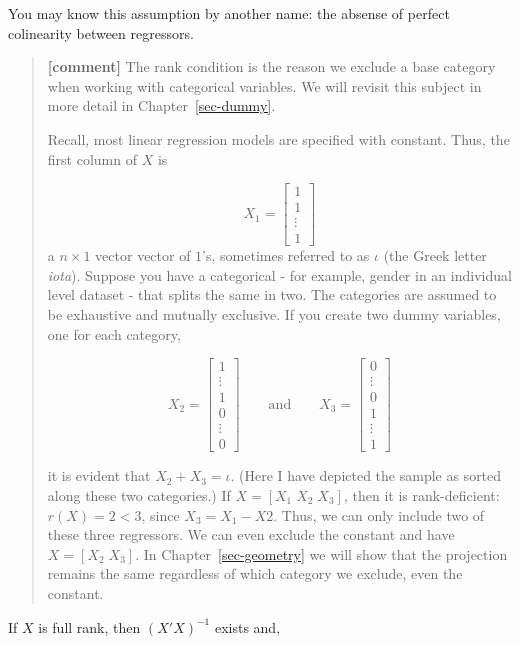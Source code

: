 \documentclass[
  letterpaper,
  DIV=11,
  numbers=noendperiod]{scrreprt}
\begin{document}
You may know this assumption by another name: the absense of perfect
colinearity between regressors.

\begin{quote}
\textbf{{[}comment{]}} The rank condition is the reason we exclude a
base category when working with categorical variables. We will revisit
this subject in more detail in Chapter~\ref{sec-dummy}.

Recall, most linear regression models are specified with constant. Thus,
the first column of \(X\) is

\[ X_1 = \begin{bmatrix}1 \\ 1 \\ \vdots \\ 1\end{bmatrix} \] a
\(n\times 1\) vector vector of \(1\)'s, sometimes referred to as
\(\iota\) (the Greek letter \emph{iota}). Suppose you have a categorical
- for example, gender in an individual level dataset - that splits the
same in two. The categories are assumed to be exhaustive and mutually
exclusive. If you create two dummy variables, one for each category,

\[ X_2 = \begin{bmatrix}1 \\ \vdots \\1\\0\\ \vdots \\ 0\end{bmatrix}\qquad\text{and}\qquad X_3 = \begin{bmatrix}0 \\ \vdots \\0\\1\\ \vdots \\ 1\end{bmatrix} \]

it is evident that \(X_2+X_3 = \iota\). (Here I have depicted the sample
as sorted along these two categories.) If \(X=[X_1\;X_2\;X_3]\), then it
is rank-deficient: \(r(X) = 2<3\), since \(X_3=X_1-X2\). Thus, we can
only include two of these three regressors. We can even exclude the
constant and have \(X=[X_2\;X_3]\). In Chapter~\ref{sec-geometry} we
will show that the projection remains the same regardless of which
category we exclude, even the constant.
\end{quote}

If \(X\) is full rank, then \((X'X)^{-1}\) exists and,
\end{document}
